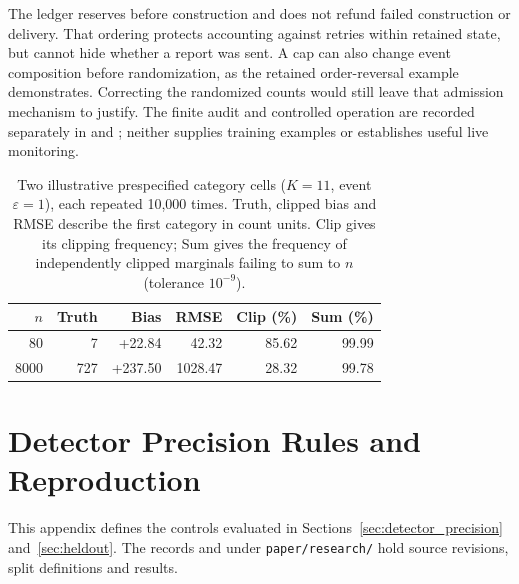 \documentclass[sigconf]{acmart}
\theoremstyle{acmdefinition}\newtheorem{property}{Property}
\begin{document}
The ledger reserves before construction and does not refund failed construction or delivery. That ordering protects accounting against retries within retained state, but cannot hide whether a report was sent. A cap can also change event composition before randomization, as the retained order-reversal example demonstrates. Correcting the randomized counts would still leave that admission mechanism to justify. The finite audit and controlled operation are recorded separately in  and ; neither supplies training examples or establishes useful live monitoring.

\begin{table}[!t]
\centering
\caption{Two illustrative prespecified category cells ($K=11$, event $\varepsilon=1$), each repeated 10,000 times. Truth, clipped bias and RMSE describe the first category in count units. Clip gives its clipping frequency; Sum gives the frequency of independently clipped marginals failing to sum to $n$ (tolerance $10^{-9}$).}
\label{tab:telemetry_utility}
\small
\setlength{\tabcolsep}{3pt}
\begin{tabular}{rrrrrr}
\toprule
$n$ & Truth & Bias & RMSE & Clip (\%) & Sum (\%) \\
\midrule
80 &7 &+22.84 &42.32 &85.62 &99.99 \\
8000 &727 &+237.50 &1028.47 &28.32 &99.78 \\
\bottomrule
\end{tabular}
\end{table}

\section{Detector Precision Rules and Reproduction}
\label{app:detprec}
This appendix defines the controls evaluated in Sections~\ref{sec:detector_precision} and~\ref{sec:heldout}. The records  and  under \texttt{paper/research/} hold source revisions, split definitions and results.
\end{document}
